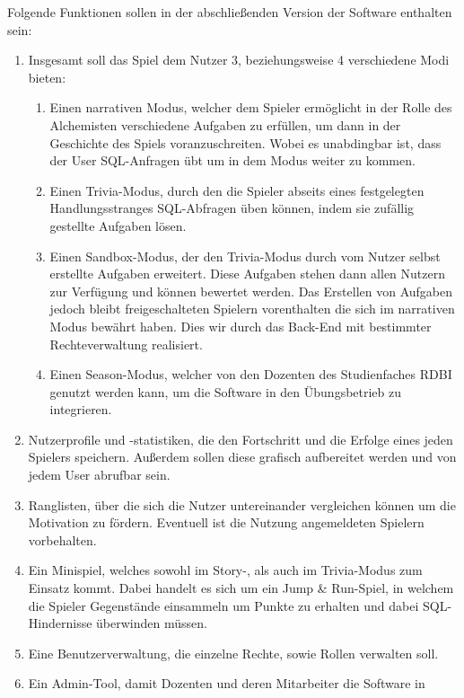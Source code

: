 Folgende Funktionen sollen in der abschlie{\ss}enden Version der Software enthalten sein:
\begin{enumerate}
	\item Insgesamt soll das Spiel dem Nutzer 3, beziehungsweise 4 verschiedene Modi bieten:
	\begin{enumerate}
      		\item Einen narrativen Modus, welcher dem Spieler erm\"oglicht in der Rolle des Alchemisten verschiedene Aufgaben zu 
			 erf\"ullen, um dann in der Geschichte des Spiels voranzuschreiten. Wobei es unabdingbar ist, dass der User
			 SQL-Anfragen \"ubt um in dem Modus weiter zu kommen.
		\item Einen Trivia-Modus, durch den die Spieler abseits eines festgelegten Handlungsstranges SQL-Abfragen \"uben 
			 k\"onnen,	indem sie zuf\"allig gestellte Aufgaben l\"osen.
		\item Einen Sandbox-Modus, der den Trivia-Modus durch vom Nutzer selbst erstellte Aufgaben erweitert. Diese Aufgaben 
			 stehen dann allen Nutzern zur Verf\"ugung und k\"onnen bewertet werden. Das Erstellen von Aufgaben jedoch bleibt freigeschalteten Spielern 
			 vorenthalten die sich im narrativen Modus bew\"ahrt haben. Dies wir durch das Back-End mit bestimmter Rechteverwaltung
			 realisiert.
		\item Einen Season-Modus, welcher von den Dozenten des Studienfaches RDBI genutzt werden kann, um die Software in den 
			 \"Ubungsbetrieb zu integrieren.
	\end{enumerate}
	\item Nutzerprofile und -statistiken, die den Fortschritt und die Erfolge eines jeden Spielers speichern. Au{\ss}erdem sollen diese grafisch
		aufbereitet werden und von jedem User abrufbar sein.
	\item Ranglisten, \"uber die sich die Nutzer untereinander vergleichen k\"onnen um die Motivation zu f\"ordern. 
		 Eventuell ist die Nutzung angemeldeten Spielern vorbehalten. 
	\item Ein Minispiel, welches sowohl im Story-, als auch im Trivia-Modus zum Einsatz kommt. Dabei handelt es sich um ein 
		 \glqq Jump \& Run\grqq-Spiel, in welchem die Spieler Gegenst\"ande einsammeln um Punkte zu erhalten und dabei 
		 SQL-Hindernisse \"uberwinden m\"ussen.
	\item Eine Benutzerverwaltung, die einzelne Rechte, sowie Rollen verwalten soll.
	\item Ein Admin-Tool, damit Dozenten und deren Mitarbeiter die Software in 

\end{enumerate}
